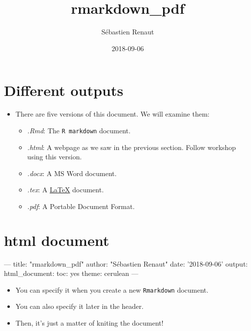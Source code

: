 \documentclass[]{article}
\title{rmarkdown\_pdf}
\author{Sébastien Renaut}
\date{2018-09-06}
\newenvironment{Shaded}{\begin{snugshade}}{\end{snugshade}}
\newcommand{\NormalTok}[1]{#1}
\providecommand{\tightlist}{%
  \setlength{\itemsep}{0pt}\setlength{\parskip}{0pt}}
\begin{document}
\maketitle

{
\setcounter{tocdepth}{2}
\tableofcontents
}
\hypertarget{different-outputs}{%
\section*{Different outputs}\label{different-outputs}}

\begin{itemize}
\tightlist
\item
  There are five versions of this document. We will examine them:

  \begin{itemize}
  \tightlist
  \item
    \emph{.Rmd}: The \texttt{R\ markdown} document.
  \item
    \emph{.html}: A webpage as we saw in the previous section. Follow
    workshop using this version.
  \item
    \emph{.docx}: A MS Word document.
  \item
    \emph{.tex}: A \href{https://www.latex-project.org}{LaTeX} document.
  \item
    \emph{.pdf}: A Portable Document Format.
  \end{itemize}
\end{itemize}

\hypertarget{html-document}{%
\section{html document}\label{html-document}}

\begin{Shaded}
\begin{Highlighting}[]
\NormalTok{---    }
\NormalTok{title: "rmarkdown_pdf"    }
\NormalTok{author: "Sébastien Renaut"    }
\NormalTok{date: '2018-09-06'    }
\NormalTok{output: }
\NormalTok{  html_document: }
\NormalTok{    toc: yes }
\NormalTok{    theme: cerulean }
\NormalTok{--- }
\end{Highlighting}
\end{Shaded}

\begin{itemize}
\item
  You can specify it when you create a new \texttt{Rmarkdown} document.
\item
  You can also specify it later in the header.
\item
  Then, it's just a matter of kniting the document!
\end{itemize}
\end{document}
